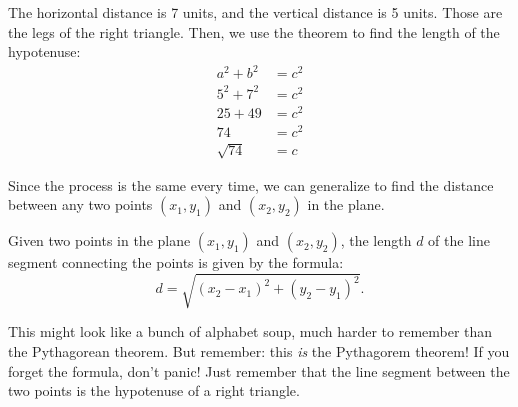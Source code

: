 The horizontal distance is 7 units, and the vertical distance is 5 units. Those are the legs of the right triangle. Then, we use the theorem to find the length of the hypotenuse: \[\begin{aligned} a^2 + b^2 &= c^2 \\ 5^2 + 7^2 &= c^2 \\ 25 + 49 &= c^2 \\ 74 &= c^2 \\ \sqrt{74} &= c\end{aligned}\]

Since the process is the same every time, we can generalize to find the distance between any two points $(x_1, y_1)$ and $(x_2, y_2)$ in the plane.

\begin{center}
\end{center}

\begin{boxdef}
Given two points in the plane $(x_1, y_1)$ and $(x_2, y_2)$, the length $d$ of the line segment connecting the points is given by the formula:
\[d = \sqrt{ (x_2 - x_1)^2 + (y_2 - y_1)^2 }.\]
\end{boxdef}

This might look like a bunch of alphabet soup, much harder to remember than the Pythagorean theorem. But remember: this \textit{is} the Pythagorem theorem! If you forget the formula, don't panic! Just remember that the line segment between the two points is the hypotenuse of a right triangle.

